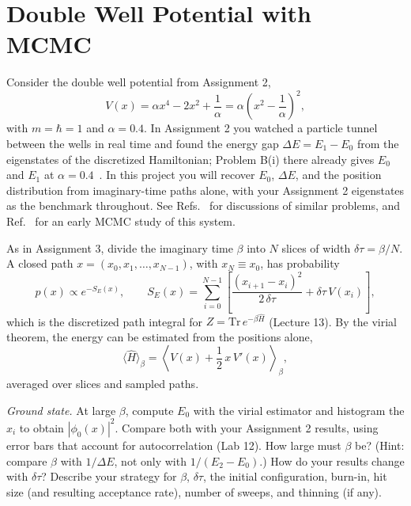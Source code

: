 \newpage
\section{Double Well Potential with MCMC}

Consider the double well potential from Assignment 2,
\begin{equation}
  V(x) = \alpha x^4 - 2x^2 + \frac{1}{\alpha} = \alpha\left(x^2 - \frac{1}{\alpha}\right)^2,
\end{equation}
with $m=\hbar=1$ and $\alpha = 0.4$.
In Assignment 2 you watched a particle tunnel between the wells in real time and found the energy gap $\Delta E = E_1 - E_0$ from the eigenstates of the discretized Hamiltonian; Problem B(i) there already gives $E_0$ and $E_1$ at $\alpha = 0.4$~\cite{Banerjee:1978}.
In this project you will recover $E_0$, $\Delta E$, and the position distribution from imaginary-time paths alone, with your Assignment 2 eigenstates as the benchmark throughout.
See Refs.~\cite{Mittal:2020,Rodgers:2014} for discussions of similar problems, and Ref.~\cite{Creutz:1981} for an early MCMC study of this system.

As in Assignment 3, divide the imaginary time $\beta$ into $N$ slices of width $\delta\tau = \beta/N$.
A closed path $x = (x_0, x_1, \ldots, x_{N-1})$, with $x_N \equiv x_0$, has probability
\begin{equation}
  p(x) \propto e^{-S_E(x)}, \qquad
  S_E(x) = \sum_{i=0}^{N-1}\left[\frac{(x_{i+1}-x_i)^2}{2\,\delta\tau} + \delta\tau\, V(x_i)\right],
\end{equation}
which is the discretized path integral for $Z = \mathrm{Tr}\, e^{-\beta\hat H}$ (Lecture 13).
By the virial theorem, the energy can be estimated from the positions alone,
\begin{equation}
  \langle\hat H\rangle_\beta = \left\langle V(x) + \frac{1}{2}\,x\,V'(x)\right\rangle_\beta,
\end{equation}
averaged over slices and sampled paths.

\begin{problem}
  \emph{Ground state.}
  At large $\beta$, compute $E_0$ with the virial estimator and histogram the $x_i$ to obtain $|\phi_0(x)|^2$.
  Compare both with your Assignment 2 results, using error bars that account for autocorrelation (Lab 12).
  How large must $\beta$ be? (Hint: compare $\beta$ with $1/\Delta E$, not only with $1/(E_2 - E_0)$.)
  How do your results change with $\delta\tau$?
  Describe your strategy for $\beta$, $\delta\tau$, the initial configuration, burn-in, hit size (and resulting acceptance rate), number of sweeps, and thinning (if any).
\end{problem}


